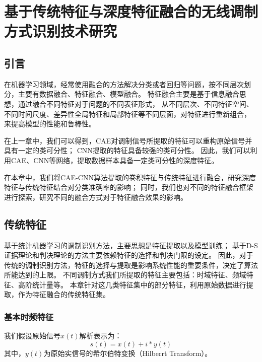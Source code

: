 \chapter{基于传统特征与深度特征融合的无线调制方式识别技术研究}
\section{引言}
在机器学习领域，经常使用融合的方法解决分类或者回归等问题，按不同层次划分，主要有数据融合、特征融合、模型融合。
特征融合主要是基于信息融合思想，通过融合不同特征对于问题的不同表征形式，
从不同层次、不同特征空间、不同时间尺度、差异性全局特征和局部特征等不同层面，对特征进行重新组合，
来提高模型的性能和鲁棒性\cite{刘渭滨2017模式分类中的特征融合方法}。\par

在上一章中，我们可以得到，CAE对调制信号所提取的特征可以重构原始信号并具有一定的类可分性；
CNN提取的特征具备较强的类可分性。
因此，我们可以利用CAE、CNN等网络，提取数据样本具备一定类可分性的深度特征。\par

在本章中，我们将CAE-CNN算法提取的卷积特征与传统特征进行融合，研究深度特征与传统特征结合对分类准确率的影响；
同时，我们也对不同的特征融合框架进行探索，研究不同的融合方式对于特征融合效果的影响。\par

\section{传统特征}
基于统计机器学习的调制识别方法，主要思想是特征提取以及模型训练；
基于D-S证据理论和判决理论的方法主要依赖特征的选择和判决门限的设定。
因此，对于传统的调制识别方法，特征的选择与提取是影响系统性能的重要条件，决定了算法所能达到的上限。
不同调制方式我们所提取的特征主要包括：时域特征、频域特征、高阶统计量等。
本章针对这几类特征集中的部分特征，利用原始数据进行提取，作为特征融合的传统特征集。\par

\subsection{基本时频特征}

我们假设原始信号$x(t)$解析表示为：
\begin{equation}
\label{eqt_4_1}
s(t)=x(t)+i*y(t)
\end{equation}
其中，$y(t)$为原始实信号的希尔伯特变换（Hilberrt Transform）。\par

